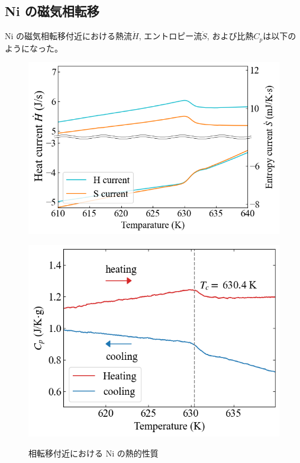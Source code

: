\documentclass[9pt,dvipdfmx,a4paper]{jsarticle}
\begin{document}
\subsection{Ni の磁気相転移}
Ni の磁気相転移付近における熱流\(\dot{H}\), エントロピー流\(\dot{S}\), および比熱\(C_p\)は以下のようになった。
\begin{figure}[hbt]
    \centering
    \begin{minipage}[t]{0.50\columnwidth}
        \centering
        \includegraphics[width = \columnwidth]{result/Ni-current.png}
        \label{graph:Ni-current}
    \end{minipage}
    \hfill
    \begin{minipage}[t]{0.46\columnwidth}
        \centering
        \includegraphics[width = \columnwidth]{result/Ni-Cp.png}
        \label{graph:Ni-Cp}
    \end{minipage}
    \caption{相転移付近における Ni の熱的性質}
    \label{graph:Ni}
\end{figure}
\end{document}
